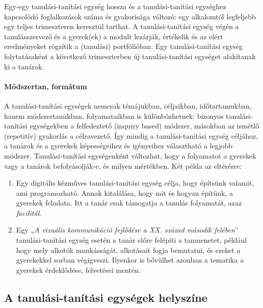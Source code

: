 Egy-egy tanulási-tanítási egység hossza és a tanulási-tanítási egységhez
kapcsolódó foglalkozások száma és gyakorisága változó: egy alkalomtól
legfeljebb egy teljes trimeszteren keresztül tarthat. A
tanulási-tanítási egység végén a tanulásszervező és a gyerek(ek) a
modult lezárják, értékelik és az elért eredményeket rögzítik a
(tanulási) portfólióban. Egy tanulási-tanítási egység folytatásaként a
következő trimeszterben új tanulási-tanítási egységet alakítanak ki a
tanárok.

\hypertarget{modszertan-formatum}{%
\paragraph{Módszertan, formátum}\label{modszertan-formatum}}

A tanulási-tanítási egységek nemcsak témájukban, céljaikban,
időtartamukban, hanem módszertanukban, folyamataikban is különbözhetnek:
bizonyos tanulási-tanítási egységekben a felfedeztető (inquiry based)
módszer, másokban az ismétlő (repetitív) gyakorlás a célravezető. Így
mindig a tanulási-tanítási egység céljához, a tanárok és a gyerekek
képességeihez és igényeihez választható a legjobb módszer.
Tanulási-tanítási egységenként változhat, hogy a folyamatot a gyerekek
vagy a tanárok befolyásolják-e, és milyen mértékben. Két példa az
eltérésre:

\begin{enumerate}
\def\labelenumi{\arabic{enumi}.}
\item
  Egy digitális kézműves tanulási-tanítási egység célja, hogy építsünk
  valamit, ami programozható. Annak kitalálása, hogy mit és hogyan
  építünk, a gyerekek feladata. Itt a tanár csak támogatja a tanulás
  folyamatát, azaz \emph{facilitál}.
\item
  Egy „\emph{A vizuális kommunikáció fejlődése a XX. század második
  felében}'' tanulási-tanítási egység esetén a tanár előre felépíti a
  tanmenetet, például hogy mely alkotók munkásságát, alkotásait fogja
  bemutatni, és ezeket a gyerekekkel sorban végigveszi. Ilyenkor is
  bővülhet azonban a tematika a gyerekek érdeklődése, felvetései mentén.
\end{enumerate}

\hypertarget{a-tanulasi-tanitasi-egysegek-helyszine}{%
\subsection{A tanulási-tanítási egységek
helyszíne}\label{a-tanulasi-tanitasi-egysegek-helyszine}}

